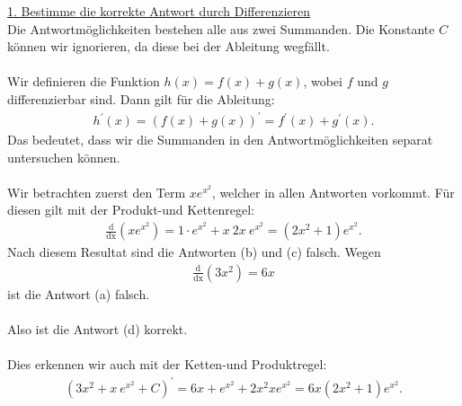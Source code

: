 \underline{1. Bestimme die korrekte Antwort durch Differenzieren}\\
Die Antwortmöglichkeiten bestehen alle aus zwei Summanden. Die Konstante $ C $ können wir ignorieren, da diese bei der Ableitung wegfällt.\\
\\
Wir definieren die Funktion $ h(x) = f(x) + g(x) $, wobei $ f $ und $ g $ differenzierbar sind.
Dann gilt für die Ableitung:
\begin{align*}
h^\prime (x) = (f(x)+g(x))^\prime
= 
f^\prime(x)+ g^\prime(x).
\end{align*}
Das bedeutet, dass wir die Summanden in den Antwortmöglichkeiten separat untersuchen können.\\
\\
Wir betrachten zuerst den Term $ x e^{x^2} $, welcher in allen Antworten vorkommt.
Für diesen gilt mit der Produkt-und Kettenregel:
\begin{align*}
\frac{\mathrm{d}}{\mathrm{dx}}(x e^{x^2})
=
1 \cdot e^{x^2} + x \ 2x \ e^{x^2}
= 
(2x^2 + 1) e^{x^2}.
\end{align*}
Nach diesem Resultat sind die Antworten (b) und (c) falsch.
Wegen
\begin{align*}
\frac{\mathrm{d}}{\mathrm{dx}} (3x^2) = 6x
\end{align*}
ist die Antwort (a) falsch.\\
\\
Also ist die Antwort (d) korrekt.\\
\\
Dies erkennen wir auch mit der Ketten-und Produktregel:
\begin{align*}
\left(3x^2  + x  \ e^{x^2} + C\right)^\prime
=
6x + e^{x^2} + 2x^2 x e^{x^2}
=
6x (2x^2 +1 ) e^{x^2}.
\end{align*}
\newpage
